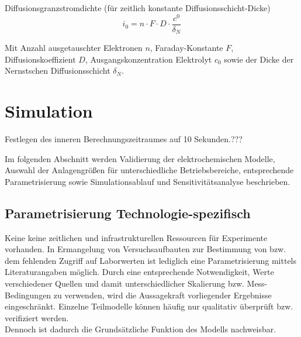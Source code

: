 \documentclass[onecolumn,10pt,titlepage]{article}
\begin{document}
Diffusionsgranzstromdichte (für zeitlich konstante Diffusionsschicht-Dicke)
\begin{equation}
i_0 = n \cdot F \cdot D \cdot \frac{c^0}{\delta_N}
\end{equation}

Mit Anzahl ausgetauschter Elektronen $n$, Faraday-Konstante $F$, Diffusionskoeffizient $D$, Ausgangskonzentration Elektrolyt $c_0$ sowie der Dicke der Nernstschen Diffusionsschicht $\delta_N$.





\section{Simulation}

Festlegen des inneren Berechnungszeitraumes auf 10 Sekunden.???

Im folgenden Abschnitt werden Validierung der elektrochemischen Modelle, Auswahl der Anlagengrößen für unterschiedliche Betriebsbereiche, entsprechende Parametrisierung sowie Simulationsablauf und Sensitivitätsanalyse beschrieben.

\subsection{Parametrisierung Technologie-spezifisch}
\label{subs_Par_je_TEch}
Keine keine zeitlichen und infrastrukturellen Ressourcen für Experimente vorhanden.
In Ermangelung von Versuchsaufbauten zur Bestimmung von bzw. dem fehlenden Zugriff auf Laborwerten ist lediglich eine Parametrisierung mittels Literaturangaben möglich. Durch eine entsprechende Notwendigkeit, Werte verschiedener Quellen und damit unterschiedlicher Skalierung bzw. Mess-Bedingungen zu verwenden, wird die Aussagekraft vorliegender Ergebnisse eingeschränkt. Einzelne Teilmodelle können häufig nur qualitativ überprüft bzw. verifiziert werden.\\
Dennoch ist dadurch die Grundsätzliche Funktion des Modells nachweisbar. %

\end{document}
